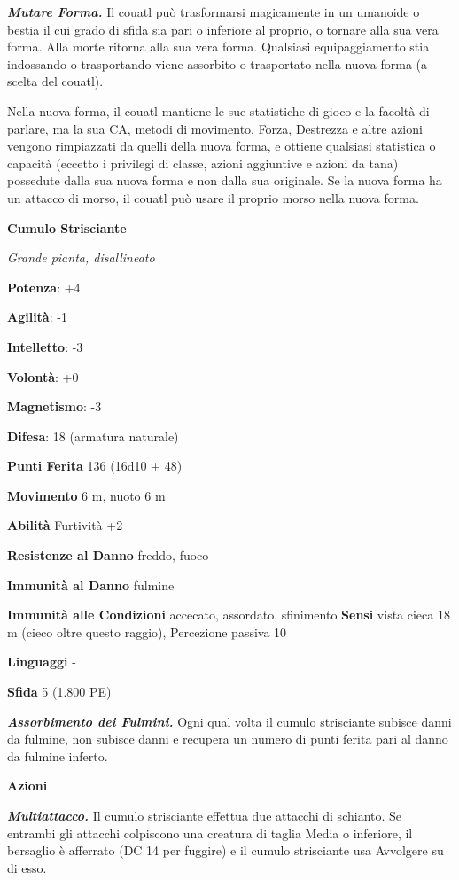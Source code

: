 \begin{multicols}{2}
\emph{\textbf{Mutare Forma.}} Il couatl può trasformarsi magicamente in
un umanoide o bestia il cui grado di sfida sia pari o inferiore al
proprio, o tornare alla sua vera forma. Alla morte ritorna alla sua vera
forma. Qualsiasi equipaggiamento stia indossando o trasportando viene
assorbito o trasportato nella nuova forma (a scelta del couatl).

Nella nuova forma, il couatl mantiene le sue statistiche di gioco e la
facoltà di parlare, ma la sua CA, metodi di movimento, Forza, Destrezza
e altre azioni vengono rimpiazzati da quelli della nuova forma, e
ottiene qualsiasi statistica o capacità (eccetto i privilegi di classe,
azioni aggiuntive e azioni da tana) possedute dalla sua nuova forma e
non dalla sua originale. Se la nuova forma ha un attacco di morso, il
couatl può usare il proprio morso nella nuova forma.

\textbf{Cumulo Strisciante}

\emph{Grande pianta, disallineato}

\textbf{Potenza}: +4

\textbf{Agilità}: -1

\textbf{Intelletto}: -3

\textbf{Volontà}: +0

\textbf{Magnetismo}: -3

\textbf{Difesa}: 18 (armatura naturale)

\textbf{Punti Ferita} 136 (16d10 + 48)

\textbf{Movimento} 6 m, nuoto 6 m

\textbf{Abilità} Furtività +2

\textbf{Resistenze al Danno} freddo, fuoco

\textbf{Immunità al Danno} fulmine

\textbf{Immunità alle Condizioni} accecato, assordato, sfinimento
\textbf{Sensi} vista cieca 18 m (cieco oltre questo raggio), Percezione
passiva 10

\textbf{Linguaggi} -

\textbf{Sfida} 5 (1.800 PE)

\emph{\textbf{Assorbimento dei Fulmini.}} Ogni qual volta il cumulo
strisciante subisce danni da fulmine, non subisce danni e recupera un
numero di punti ferita pari al danno da fulmine inferto.

\textbf{Azioni}

\emph{\textbf{Multiattacco.}} Il cumulo strisciante effettua due
attacchi di schianto. Se entrambi gli attacchi colpiscono una creatura
di taglia Media o inferiore, il bersaglio è afferrato (DC 14 per
fuggire) e il cumulo strisciante usa Avvolgere su di esso.


\end{multicols}
